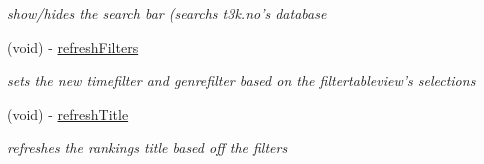 \begin{DoxyCompactItemize}
\begin{DoxyCompactList}\small\item\em show/hides the search bar (searchs t3k.\-no's database \end{DoxyCompactList}\item 
\hypertarget{interface_c_b_h_view_controller_abaeea19211dc5b286535c2b63582d1a5}{(void) -\/ \hyperlink{interface_c_b_h_view_controller_abaeea19211dc5b286535c2b63582d1a5}{refresh\-Filters}}\label{interface_c_b_h_view_controller_abaeea19211dc5b286535c2b63582d1a5}

\begin{DoxyCompactList}\small\item\em sets the new timefilter and genrefilter based on the filtertableview's selections \end{DoxyCompactList}\item 
\hypertarget{interface_c_b_h_view_controller_a0d25f2dcd6002af4ee0a1a0f184c38cb}{(void) -\/ \hyperlink{interface_c_b_h_view_controller_a0d25f2dcd6002af4ee0a1a0f184c38cb}{refresh\-Title}}\label{interface_c_b_h_view_controller_a0d25f2dcd6002af4ee0a1a0f184c38cb}

\begin{DoxyCompactList}\small\item\em refreshes the rankings title based off the filters \end{DoxyCompactList}\end{DoxyCompactItemize}
